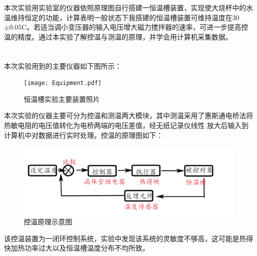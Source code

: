 ﻿\documentclass[10.5pt]{article}
\begin{document}
\title{\textbf{}} %
\author{}
\date{}
\maketitle
\section{\textbf{}}
本次实验用实验室的仪器依照原理图自行搭建一恒温槽装置，实现使大烧杯中的水温维持恒定的功能，计算表明一般状态下我搭建的恒温槽装置可维持温度在30$\pm0.05$\degree C。若适当调小变压器的输入电压增大磁力搅拌器的速率，可进一步提高控温的精度。通过本实验了解控温与测温的原理，并学会用计算机采集数据。
\section{\textbf{}}
\subsection{\textbf{}}
本次实验用到的主要仪器如下图所示：
\begin{figure}[!ht]
\centering
\caption{恒温槽实验主要装置照片}
\texttt{[image: Equipment.pdf]}
\end{figure}


本次实验的仪器主要可分为控温和测温两大模块，其中测温采用了惠斯通电桥法将热敏电阻的电压值转化为电桥两端的电压差值，经无纸记录仪线性
放大后输入到计算机中对数据进行实时处理。控温的原理图如下：
\begin{figure}[!ht]
\centering
\caption{控温原理示意图}
\includegraphics[width=400pt]{PrincipleFigure01.pdf}
\end{figure}


该控温装置为一闭环控制系统，实验中发现该系统的灵敏度不够高，这可能是热得快加热功率过大以及恒温槽温度分布不均所致。
\end{document}
